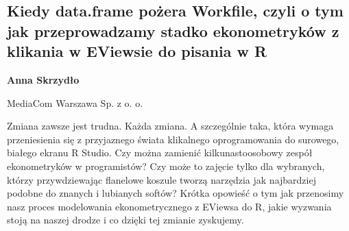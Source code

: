 \documentclass[\main/boa.tex]{subfiles}
\begin{document}
\subsection{Kiedy data.frame pożera Workfile, czyli o tym jak przeprowadzamy stadko ekonometryków z klikania w EViewsie do pisania w R}

\begin{minipage}{0.915\textwidth}
	\centering
  {\bf {}Anna Skrzydło}
\end{minipage}


\begin{affiliations}
\begin{minipage}{0.915\textwidth}
\centering
MediaCom Warszawa Sp. z o. o. \\[-2pt]
\end{minipage}
\end{affiliations}

\vskip 0.3cm

Zmiana zawsze jest trudna. Każda zmiana. A szczególnie taka, która wymaga przeniesienia się z przyjaznego świata klikalnego oprogramowania do surowego, białego ekranu R Studio. Czy można zamienić kilkunastoosobowy zespół ekonometryków w programistów? Czy może to zajęcie tylko dla wybranych, którzy przywdziewając flanelowe koszule tworzą narzędzia jak najbardziej podobne do znanych i lubianych softów? Krótka opowieść o tym jak przenosimy nasz proces modelowania ekonometrycznego z EViewsa do R, jakie wyzwania stoją na naszej drodze i co dzięki tej zmianie zyskujemy. 
\end{document}
